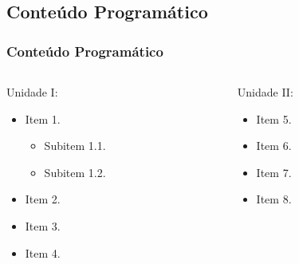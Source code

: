 \subsection[Conteúdo Programático]{Conteúdo Programático}\label{subsec:plano-ensino-conteudo}



\begin{frame}[t]\frametitle{Conteúdo Programático}

  \begin{columns}[onlytextwidth,T]

    \begin{column}{0.5\linewidth}
      \begin{block}{Unidade I:}
        \begin{itemize}\small
          \justifying{}
          \item Item 1.
          \begin{itemize}\scriptsize
            \justifying{}
            \item Subitem 1.1.
            \item Subitem 1.2.
          \end{itemize}
          \item Item 2.
          \item Item 3.
          \item Item 4.
        \end{itemize}
      \end{block}
    \end{column}

    \begin{column}{0.5\linewidth}
      \begin{block}{Unidade II:}
        \begin{itemize}\small
          \justifying{}
          \item Item 5.
          \item Item 6.
          \item Item 7.
          \item Item 8.
        \end{itemize}
      \end{block}
    \end{column}

  \end{columns}

\end{frame}



